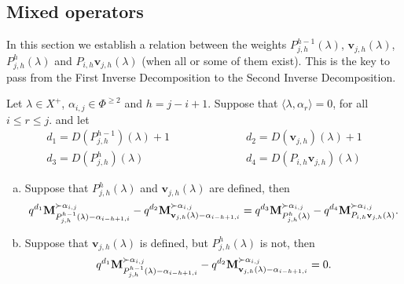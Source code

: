 \subsection{Mixed operators}

In this section we establish a relation between the weights 
$P^{h-1}_{j,h}(\lambda)$, 
$\mathbf{v}_{j,h}(\lambda)$,
$P^{h}_{j,h}(\lambda)$ and
$P_{i,h}\mathbf{v}_{j,h}(\lambda)$
(when all or some of them exist).
This is the key to pass from the First Inverse Decomposition to the Second Inverse Decomposition. 

\begin{lemma}\rm\label{lem: ultimo P}
    Let $\lambda\in X^{+}$,  $\alpha_{i,j}\in \Phi^{\geq 2}$ and $h=j-i+1$. 
    Suppose that $\langle \lambda , \alpha_r \rangle  =0$, for all $i\leq r \leq j$.
    and let 
\begin{equation}
    \begin{array}{lll}
      d_{1} =D(P^{h-1}_{j,h})(\lambda)+1   & \mbox{ }\qquad \mbox{ }\qquad    & d_{2}=D(\mathbf{v}_{j,h})(\lambda)+1 \\
      d_{3} = D(P^{h}_{j,h})(\lambda)   & \mbox{ }\qquad  \mbox{ }\qquad    &  d_{4}=D(P_{i,h}\mathbf{v}_{j,h})(\lambda)
    \end{array}
\end{equation}
    \begin{enumerate}[(a)]
        \item Suppose that $P^{h}_{j,h}(\lambda)$ and $\mathbf{v}_{j,h}(\lambda)$ are defined, then\label{item P existe}
    \begin{equation} \label{eq: ultimo P existe}
      q^{d_{1}} \mathbf{M}_{P^{h-1}_{j,h}(\lambda) - \alpha_{i-h+1,i}}^{\succ \alpha_{i,j}} - q^{d_{2}} \mathbf{M}_{\mathbf{v}_{j,h}(\lambda)-\alpha_{i-h+1,i}}^{\succ \alpha_{i,j}} = q^{d_{3}} \mathbf{M}_{P^{h}_{j,h}(\lambda)}^{\succ \alpha_{i,j}} - q^{d_{4}} \mathbf{M}_{P_{i,h}\mathbf{v}_{j,h}(\lambda)}^{\succ \alpha_{i,j}}.
    \end{equation}
        \item Suppose that $\mathbf{v}_{j,h}(\lambda)$ is defined, but $P^{h}_{j,h}(\lambda)$ is not, then\label{item P no existe}
    \begin{equation}\label{eq: ultimo P no existe}
        q^{d_{1}} \bfM_{P^{h-1}_{j,h}(\lambda) - \alpha_{i-h+1,i}}^{\succ \alpha_{i,j}} - q^{d_{2}} \bfM_{\mathbf{v}_{j,h}(\lambda)-\alpha_{i-h+1,i}}^{\succ \alpha_{i,j}} = 0.

\end{equation}
\end{enumerate}
\end{lemma}
